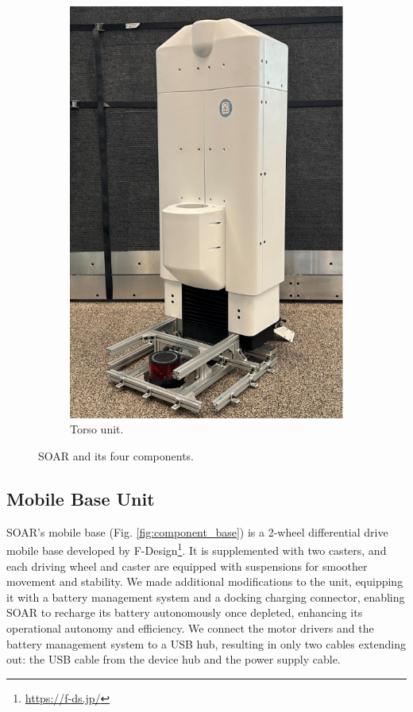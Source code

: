 \documentclass[runningheads,a4paper]{llncs}
\begin{document}
\begin{figure}[tbp]
\begin{minipage}[b]{0.25\linewidth}
\begin{subfigure}[b]{\linewidth}
			\includegraphics[width=\linewidth]{images/component_torso.png}
			\caption{Torso unit.}
			\label{fig:component_torso}
		\end{subfigure}
	\end{minipage}
	\caption{SOAR and its four components.}
	\label{fig:components}
\end{figure}

\subsection{Mobile Base Unit}
SOAR’s mobile base (Fig. \ref{fig:component_base}) is a 2-wheel differential drive mobile base developed by F-Design\footnote{\url{https://f-ds.jp/}}.
It is supplemented with two casters, and each driving wheel and caster are equipped with suspensions for smoother movement and stability.
We made additional modifications to the unit, equipping it with a battery management system and a docking charging connector, enabling SOAR to recharge its battery autonomously once depleted, enhancing its operational autonomy and efficiency.
We connect the motor drivers and the battery management system to a USB hub, resulting in only two cables extending out: the USB cable from the device hub and the power supply cable.
\end{document}
